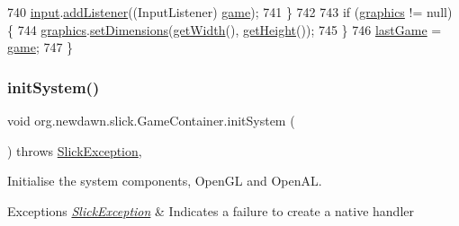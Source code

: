 \begin{DoxyCode}
740             \mbox{\hyperlink{classorg_1_1newdawn_1_1slick_1_1_game_container_a2902f3d98d24fc41fc32d591f39eb587}{input}}.\mbox{\hyperlink{classorg_1_1newdawn_1_1slick_1_1_input_a281147c97d575c9a5a69004f31fcd596}{addListener}}((InputListener) \mbox{\hyperlink{classorg_1_1newdawn_1_1slick_1_1_game_container_a6a38bb26e45e1c884940caf35c7cfcdc}{game}});
741         \}
742 
743         \textcolor{keywordflow}{if} (\mbox{\hyperlink{classorg_1_1newdawn_1_1slick_1_1_game_container_ab33d45e90ae9dcfcfd9c7a907415a58b}{graphics}} != null) \{
744             \mbox{\hyperlink{classorg_1_1newdawn_1_1slick_1_1_game_container_ab33d45e90ae9dcfcfd9c7a907415a58b}{graphics}}.\mbox{\hyperlink{classorg_1_1newdawn_1_1slick_1_1_graphics_a0e154c1ece7603367974df28f2e38a62}{setDimensions}}(\mbox{\hyperlink{classorg_1_1newdawn_1_1slick_1_1_game_container_a938fe1a28567182445e60450915d5f69}{getWidth}}(), 
      \mbox{\hyperlink{classorg_1_1newdawn_1_1slick_1_1_game_container_a7eff88473fe5715fdfc2f92e8cb48521}{getHeight}}());
745         \}
746         \mbox{\hyperlink{classorg_1_1newdawn_1_1slick_1_1_game_container_a87a51923caf67c163de08ce0a0295454}{lastGame}} = \mbox{\hyperlink{classorg_1_1newdawn_1_1slick_1_1_game_container_a6a38bb26e45e1c884940caf35c7cfcdc}{game}};
747     \}
\end{DoxyCode}
\mbox{\label{classorg_1_1newdawn_1_1slick_1_1_game_container_a6fee625fa386e0ef5a99b6f4bcc3f147}} 
\subsubsection{\texorpdfstring{init\+System()}{initSystem()}}
{\footnotesize\ttfamily void org.\+newdawn.\+slick.\+Game\+Container.\+init\+System (\begin{DoxyParamCaption}{ }\end{DoxyParamCaption}) throws \mbox{\hyperlink{classorg_1_1newdawn_1_1slick_1_1_slick_exception}{Slick\+Exception}}\hspace{0.3cm}{\ttfamily [inline]}, {\ttfamily [protected]}}

Initialise the system components, Open\+GL and Open\+AL.


\begin{DoxyExceptions}{Exceptions}
{\em \mbox{\hyperlink{classorg_1_1newdawn_1_1slick_1_1_slick_exception}{Slick\+Exception}}} & Indicates a failure to create a native handler \\
\hline
\end{DoxyExceptions}

